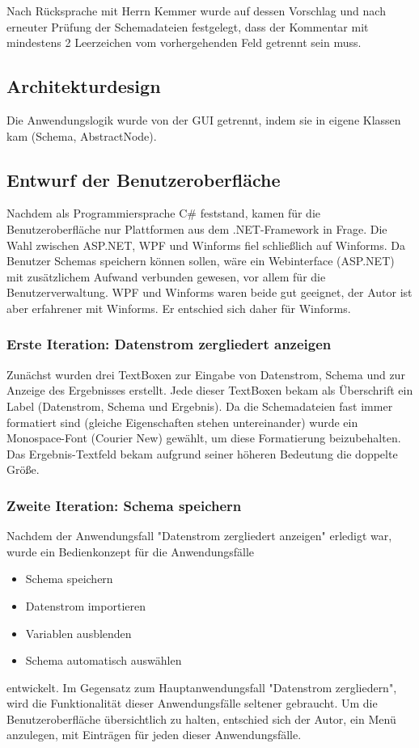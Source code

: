 Nach Rücksprache mit Herrn Kemmer wurde auf dessen Vorschlag und nach erneuter Prüfung der Schemadateien festgelegt, dass der Kommentar mit mindestens 2 Leerzeichen vom vorhergehenden Feld getrennt sein muss.

\subsection{Architekturdesign}
\label{sec:Architekturdesign}
Die Anwendungslogik wurde von der GUI getrennt, indem sie in eigene Klassen kam (Schema, AbstractNode).


\subsection{Entwurf der Benutzeroberfläche}
\label{sec:Benutzeroberflaeche}
Nachdem als Programmiersprache C\# feststand, kamen für die Benutzeroberfläche nur  Plattformen aus dem .NET-Framework in Frage. Die Wahl zwischen ASP.NET, WPF und Winforms fiel schließlich auf Winforms. Da Benutzer Schemas speichern können sollen, wäre ein Webinterface (ASP.NET) mit zusätzlichem Aufwand verbunden gewesen, vor allem für die Benutzerverwaltung. WPF und Winforms waren beide gut geeignet, der Autor ist aber erfahrener mit Winforms. Er entschied sich daher für Winforms.

\subsubsection{Erste Iteration: Datenstrom zergliedert anzeigen}
\label{sec:BenutzeroberflaecheZergliedern}
Zunächst wurden drei TextBoxen zur Eingabe von Datenstrom, Schema und zur Anzeige des Ergebnisses erstellt. Jede dieser TextBoxen bekam als Überschrift ein Label (Datenstrom, Schema und Ergebnis). Da die Schemadateien fast immer formatiert sind (gleiche Eigenschaften stehen untereinander) wurde ein Monospace-Font (Courier New) gewählt, um diese Formatierung beizubehalten. Das Ergebnis-Textfeld bekam aufgrund seiner höheren Bedeutung die doppelte Größe.

\subsubsection{Zweite Iteration: Schema speichern}
\label{BenutzeroberflaecheSpeichern}
Nachdem der Anwendungsfall "Datenstrom zergliedert anzeigen" erledigt war, wurde ein Bedienkonzept für die Anwendungsfälle
\begin{itemize}
\item Schema speichern
\item Datenstrom importieren
\item Variablen ausblenden
\item Schema automatisch auswählen
\end{itemize}
entwickelt. Im Gegensatz zum Hauptanwendungsfall "Datenstrom zergliedern", wird die Funktionalität dieser Anwendungsfälle seltener gebraucht. Um die Benutzeroberfläche übersichtlich zu halten, entschied sich der Autor, ein Menü anzulegen, mit Einträgen für jeden dieser Anwendungsfälle.

